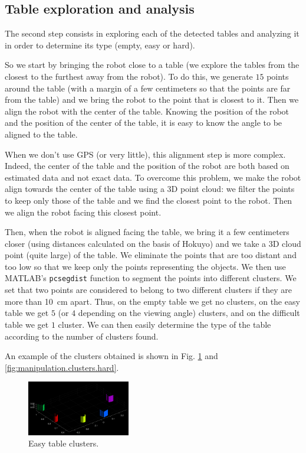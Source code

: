\documentclass[a4paper, 10pt, conference]{ieeeconf}
\begin{document}
    \subsection{Table exploration and analysis}
    
    The second step consists in exploring each of the detected tables and analyzing it in order to determine its type (empty, easy or hard).
    
    So we start by bringing the robot close to a table (we explore the tables from the closest to the furthest away from the robot). To do this, we generate $15$ points around the table (with a margin of a few centimeters so that the points are far from the table) and we bring the robot to the point that is closest to it. Then we align the robot with the center of the table. Knowing the position of the robot and the position of the center of the table, it is easy to know the angle to be aligned to the table.
    
    When we don't use GPS (or very little), this alignment step is more complex. Indeed, the center of the table and the position of the robot are both based on estimated data and not exact data. To overcome this problem, we make the robot align towards the center of the table using a 3D point cloud: we filter the points to keep only those of the table and we find the closest point to the robot. Then we align the robot facing this closest point.
    
    Then, when the robot is aligned facing the table, we bring it a few centimeters closer (using distances calculated on the basis of Hokuyo) and we take a 3D cloud point (quite large) of the table. We eliminate the points that are too distant and too low so that we keep only the points representing the objects. We then use MATLAB's \texttt{pcsegdist} function to segment the points into different clusters. We set that two points are considered to belong to two different clusters if they are more than \SI{10}{\centi\meter} apart. Thus, on the empty table we get no clusters, on the easy table we get $5$ (or $4$ depending on the viewing angle) clusters, and on the difficult table we get $1$ cluster. We can then easily determine the type of the table according to the number of clusters found.
    
    An example of the clusters obtained is shown in Fig. \ref{fig:manipulation.clusters.easy} and \ref{fig:manipulation.clusters.hard}.
    
    \begin{figure}[!h]
        \centering
        \includegraphics[width=0.4\textwidth]{resources/png/clusters-easy.png}
        \caption{Easy table clusters.}
        \label{fig:manipulation.clusters.easy}
    \end{figure}
    
\end{document}
